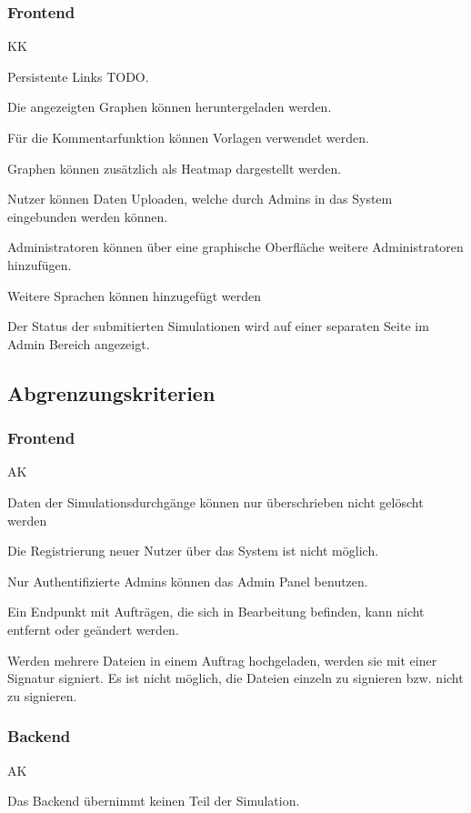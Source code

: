 \subsubsection{Frontend}
\begin{Kriterien}{KK}

	\item Persistente Links TODO.

	\item Die angezeigten Graphen können heruntergeladen werden.

	\item Für die Kommentarfunktion können Vorlagen verwendet werden.

	\item Graphen können zusätzlich als Heatmap dargestellt werden.

	\item Nutzer können Daten Uploaden, welche durch Admins in das System eingebunden werden können.

	\item Administratoren können über eine graphische Oberfläche weitere Administratoren hinzufügen.

    \item Weitere Sprachen können hinzugefügt werden

    
	\item Der Status der submitierten Simulationen wird auf einer separaten Seite im Admin Bereich angezeigt.

\end{Kriterien}


\subsection{Abgrenzungskriterien}
\setcounter{counter}{10}
\subsubsection{Frontend}
\begin{Kriterien}{AK}

	\item Daten der Simulationsdurchgänge können nur überschrieben nicht gelöscht werden 

	\item Die Registrierung neuer Nutzer über das \gls{System} ist nicht möglich.

	\item Nur Authentifizierte Admins können das Admin Panel benutzen.


	\item Ein Endpunkt mit Aufträgen, die sich in Bearbeitung befinden, kann nicht entfernt oder geändert werden.

	\item Werden mehrere Dateien in einem Auftrag hochgeladen, werden sie mit einer Signatur signiert. Es ist nicht möglich, die Dateien einzeln zu signieren bzw. nicht zu signieren.
\end{Kriterien}

\subsubsection{Backend}
\begin{Kriterien}{AK}

	\item Das Backend übernimmt keinen Teil der Simulation.

\end{Kriterien}


